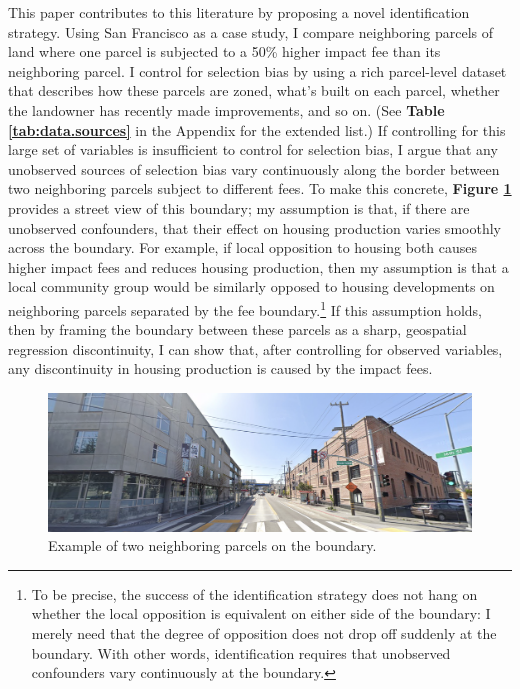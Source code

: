 \documentclass[a4paper,12pt]{article}
\begin{document}
This paper contributes to this literature by proposing a novel identification strategy. Using San Francisco as a case study, I compare neighboring parcels of land where one parcel is subjected to a 50\% higher impact fee than its neighboring parcel. I control for selection bias by using a rich parcel-level dataset that describes how these parcels are zoned, what's built on each parcel, whether the landowner has recently made improvements, and so on. (See \textbf{Table \ref{tab:data.sources}} in the Appendix for the extended list.) If controlling for this large set of variables is insufficient to control for selection bias, I argue that any unobserved sources of selection bias vary continuously along the border between two neighboring parcels subject to different fees. To make this concrete, \textbf{Figure \ref{fig:eg_boundary}} provides a street view of this boundary; my assumption is that, if there are unobserved confounders, that their effect on housing production varies smoothly across the boundary. For example, if local opposition to housing both causes higher impact fees and reduces housing production, then my assumption is that a local community group would be similarly opposed to housing developments on neighboring parcels separated by the fee boundary.\footnote{To be precise, the success of the identification strategy does not hang on whether the local opposition is equivalent on either side of the boundary: I merely need that the degree of opposition does not drop off suddenly at the boundary. With other words, identification requires that unobserved confounders vary continuously at the boundary.} If this assumption holds, then by framing the boundary between these parcels as a sharp, geospatial regression discontinuity, I can show that, after controlling for observed variables, any discontinuity in housing production is caused by the impact fees.

\begin{figure}[hpbt]
\centering
    \includegraphics[scale=.3]{figures/boundary_eg.png}
    \caption{Example of two neighboring parcels on the boundary.}
    \label{fig:eg_boundary}
\end{figure}
\end{document}
